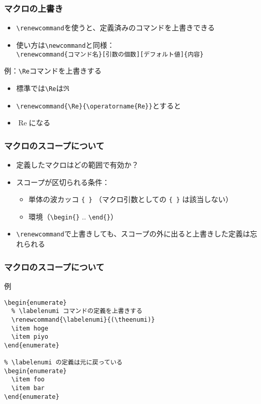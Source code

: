 \documentclass[aspectratio=169]{beamer}
\newcommand\cmdname[1]{\texttt{\textbackslash #1}}
\begin{document}
\begin{frame}[fragile]\frametitle{マクロの上書き}
  \begin{itemize}
  \item \cmdname{renewcommand}を使うと、定義済みのコマンドを上書きできる
  \item 使い方は\cmdname{newcommand}と同様： \\
    \lstinline!\renewcommand{コマンド名}[引数の個数][デフォルト値]{内容}!
  \end{itemize}
  \begin{exampleblock}{例：\cmdname{Re}コマンドを上書きする}
    \begin{itemize}
    \item 標準では\cmdname{Re}は$\Re$
    \item \lstinline!\renewcommand{\Re}{\operatorname{Re}}!とすると
    \item \renewcommand{\Re}{\operatorname{Re}} $\Re$になる
    \end{itemize}
  \end{exampleblock}
\end{frame}
\begin{frame}\frametitle{マクロのスコープについて}
  \begin{itemize}
  \item 定義したマクロはどの範囲で有効か？
  \item スコープが区切られる条件：
    \begin{itemize}
    \item 単体の波カッコ \texttt{\{ \}} （マクロ引数としての \texttt{\{ \}} は該当しない）
    \item 環境（\cmdname{begin\{\}} .. \cmdname{end\{\}}）
    \end{itemize}
  \item \cmdname{renewcommand}で上書きしても、スコープの外に出ると上書きした定義は忘れられる
  \end{itemize}
\end{frame}
\begin{frame}[fragile]\frametitle{マクロのスコープについて}
  \begin{exampleblock}{例}
\begin{lstlisting}
\begin{enumerate}
  % \labelenumi コマンドの定義を上書きする
  \renewcommand{\labelenumi}{(\theenumi)}
  \item hoge
  \item piyo
\end{enumerate}

% \labelenumi の定義は元に戻っている
\begin{enumerate}
  \item foo
  \item bar
\end{enumerate}
\end{lstlisting}
\end{exampleblock}
\end{frame}
\end{document}
